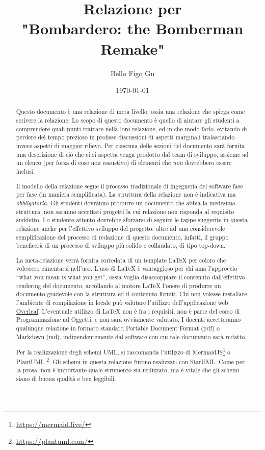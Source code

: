 \documentclass[a4paper,12pt]{report}
\title{Relazione per\\"Bombardero: the Bomberman Remake"}
\author{Bello Figo Gu}
\date{\today}
\begin{document}
\maketitle

\begin{abstract}
Questo documento è una relazione di meta livello, ossia una relazione che spiega come scrivere la relazione.
%
Lo scopo di questo documento è quello di aiutare gli studenti a comprendere quali punti trattare nella loro relazione, ed in che modo farlo, evitando di perdere del tempo prezioso in prolisse discussioni di aspetti marginali tralasciando invece aspetti di maggior rilievo.
%
Per ciascuna delle sezioni del documento sarà fornita una descrizione di ciò che ci si aspetta venga prodotto dal team di sviluppo, assieme ad un elenco (per forza di cose non esaustivo) di elementi che \emph{non} dovrebbero essere inclusi.

Il modello della relazione segue il processo tradizionale di ingegneria del software fase per fase (in maniera semplificata).
%
La struttura della relazione non è indicativa ma \textit{obbligatoria}.
%
Gli studenti dovranno produrre un documento che abbia la medesima struttura, non saranno accettati progetti la cui relazione non risponda al requisito suddetto.
%
Lo studente attento dovrebbe sforzarsi di seguire le tappe suggerite in questa relazione anche per l'effettivo sviluppo del progetto: oltre ad una considerevole semplificazione del processo di redazione di questo documento, infatti, il gruppo beneficerà di un processo di sviluppo più solido e collaudato, di tipo top-down.

La meta-relazione verrà fornita corredata di un template \LaTeX{} per coloro che volessero cimentarsi nell'uso.
%
L'uso di \LaTeX{} è vantaggioso per chi ama l'approccio ``what you mean is what you get'', ossia voglia disaccoppiare il contenuto dall'effettivo rendering del documento, accollando al motore \LaTeX{} l'onere di produrre un documento gradevole con la struttura ed il contenuto forniti.
%
Chi non volesse installare l'ambiente di compilazione in locale può valutare l'utilizzo dell'applicazione web \href{https://www.overleaf.com/}{Overleaf}.
%
L'eventuale utilizzo di \LaTeX{} non è fra i requisiti,
non è parte del corso di Programmazione ad Oggetti, e non sarà ovviamente valutato.
%
I docenti accetteranno qualunque relazione in formato standard Portable Document Format (pdf) o Markdown (md), indipendentemente dal software con cui tale documento sarà redatto.

Per la realizzazione degli schemi UML, si raccomanda l'utilizzo di MermaidJS\footnote{\url{https://mermaid.live/}} o PlantUML \footnote{\url{https://plantuml.com/}}.
%
Gli schemi in questa relazione furono realizzati con StarUML.
%
Come per la prosa, non è importante quale strumento sia utilizzato, ma è vitale che gli schemi siano di buona qualità e ben leggibili.

\end{abstract}
\end{document}
